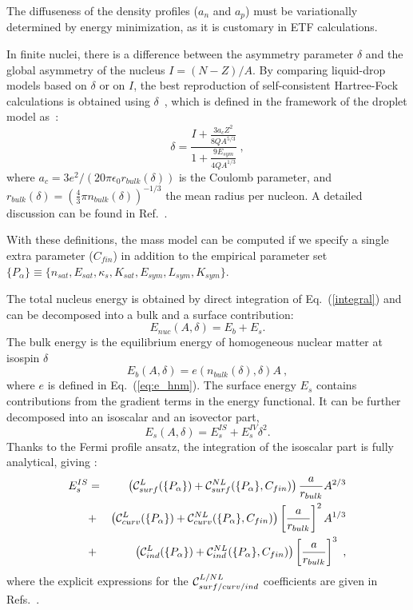 \documentclass
[aps,prc,twocolumn,showpacs,showkeys,amsmath,floatfix,superscriptaddress]{revtex4}
\begin{document}
The diffuseness of the density profiles ($a_n$ and $a_p$) must be variationally determined by energy minimization, as it is customary in ETF calculations.  
{In finite nuclei, there is a difference between the asymmetry parameter $\delta$ and the global asymmetry of the nucleus $I=(N-Z)/A$.
By comparing liquid-drop models based on $\delta$ or on $I$, the best reproduction of self-consistent Hartree-Fock calculations is obtained using 
$\delta$~\cite{Panagiota,Francois3},
which is defined in the framework of the droplet model as~\cite{meyers}:
\begin{equation}
\delta = \frac{I + \frac{3 a_c Z^2}{8 Q A^{5/3}} }{1 + \frac{9 E_{sym}}{4 Q A^{1/3}} }~,
\end{equation}
where $a_c=3e^2/(20\pi\epsilon_0r_{bulk}(\delta))$ is the Coulomb parameter, 
and $r_{bulk}(\delta)= \left(\frac{4}{3}\pi n_{bulk}(\delta)\right)^{-1/3}$ the mean radius per nucleon.
A detailed discussion can be found in Ref.~\cite{Francois3}.

With these definitions, the mass model can be computed if we specify a single extra parameter ($C_{fin}$) in addition to the  {empirical parameter} set $\{P_\alpha\}\equiv \{n_{sat},E_{sat},\kappa_s,K_{sat},E_{sym},L_{sym},K_{sym}\}$.

The total nucleus energy is obtained by direct integration of Eq.~(\ref{integral}) and can be decomposed into a bulk and a surface contribution:
\begin{equation}
E_{nuc}(A,\delta) = E_b + E_s. \label{eq:mass}
\end{equation}
The bulk energy is the equilibrium energy of homogeneous nuclear matter at isospin $\delta$
\begin{equation}
 E_b(A,\delta) = e(n_{bulk}(\delta),\delta) A~,
\end{equation}
where  $e$ is defined in Eq.~(\ref{eq:e_hnm}).
The surface energy $E_s$ contains contributions from the gradient terms in the energy functional. 
It can be further decomposed into an isoscalar and an isovector part,
\begin{equation}
E_s(A,\delta)=E_s^{IS}+E_s^{IV}\delta^2. \label{eq:es}
\end{equation}
  Thanks to the Fermi profile ansatz, the integration of the isoscalar part is fully analytical, giving \cite{Francois1,Francois2}:
%
\begin{eqnarray}
E_s^{IS} &=& \left ( {\cal{C}}_{surf}^L(\{P_\alpha\})+ {\cal{C}}_{surf}^{NL}(\{P_\alpha\},C_{fin})\right ) \frac{a}{r_{bulk}} A^{2/3}  \nonumber \\
&+&  \left ( {\cal{C}}_{curv}^L(\{P_\alpha\})+ {\cal{C}}_{curv}^{NL}(\{P_\alpha\}, C_{fin})\right )\left[ \frac{a}{r_{bulk}} \right]^2 A^{1/3} \nonumber \\
&+&  \left ( {\cal{C}}_{ind}^L(\{P_\alpha\})+ {\cal{C}}_{ind}^{NL}(\{P_\alpha\},C_{fin})\right ) \left[ \frac{a}{r_{bulk}} \right]^3 ~,
\label{eq:e_s^l}
\end{eqnarray}
where 
 the explicit expressions for the
${\cal{C}}_{surf/curv/ind}^{L/NL}$ coefficients are given in Refs.~\cite{Francois1,Francois2}.

}
\end{document}
